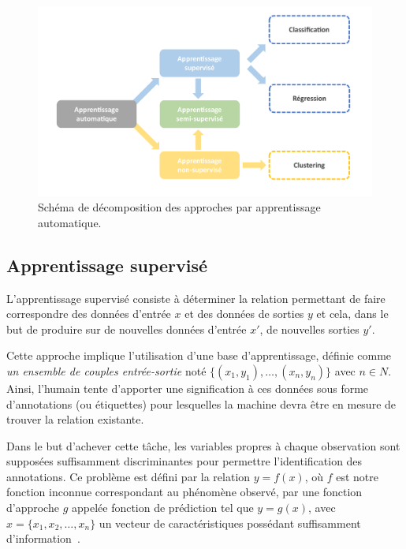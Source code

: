 \begin{figure}[H]
    \centering 
    \includegraphics[width=\linewidth]{contents/chapter_3/resources/scheme_machine_learning.pdf}
    \caption{Schéma de décomposition des approches par apprentissage automatique.}
    \label{fig:scheme_machine_learning}
\end{figure}

\subsection{Apprentissage supervisé}
\label{sec:supervised_learning}
L’apprentissage supervisé consiste à déterminer la relation permettant de faire correspondre des données d’entrée $x$ et des données de sorties $y$ et cela, dans le but de produire sur de nouvelles données d’entrée $x'$, de nouvelles sorties $y'$.\par

Cette approche implique l’utilisation d’une base d’apprentissage, définie comme \textit{un ensemble de couples entrée-sortie} noté $\{(x_1,y_1 ),\ldots,(x_n,y_n )\}$ avec $n \in N$. Ainsi, l’humain tente d'apporter une signification à ces données sous forme d'annotations (ou étiquettes) pour lesquelles la machine devra être en mesure de trouver la relation existante.\par

Dans le but d'achever cette tâche, les variables propres à chaque observation sont supposées suffisamment discriminantes pour permettre l'identification des annotations. Ce problème est défini par la relation $y=f(x)$, où $f$ est notre fonction inconnue correspondant au phénomène observé, par une fonction d’approche $g$ appelée fonction de prédiction tel que $y=g(x)$, avec $x=\{x_1,x_2,\ldots,x_n\}$ un vecteur de caractéristiques possédant suffisamment d'information~\cite{foulds2010}.\par 

